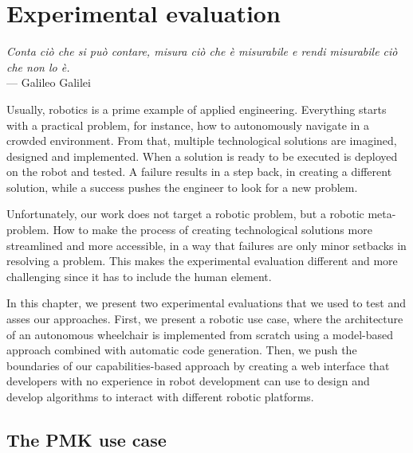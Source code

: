 \chapter[Experimental evaluation]{Experimental evaluation}\label{ch:Experiment}

\begin{flushright}{\slshape Conta ciò che si può contare, misura ciò che è misurabile e rendi misurabile ciò che non lo è.} \\ \medskip
    ---  Galileo Galilei
\end{flushright}

Usually, robotics is a prime example of applied engineering. Everything starts with a practical problem, for instance, how to autonomously navigate in a crowded environment. From that, multiple technological solutions are imagined, designed and implemented. When a solution is ready to be executed is deployed on the robot and tested. A failure results in a step back, in creating a different solution, while a success pushes the engineer to look for a new problem. 

Unfortunately, our work does not target a robotic problem, but a robotic meta-problem. How to make the process of creating technological solutions more streamlined and more accessible, in a way that failures are only minor setbacks in resolving a problem. This makes the experimental evaluation different and more challenging since it has to include the human element.

In this chapter, we present two experimental evaluations that we used to test and asses our approaches. First, we present a robotic use case, where the architecture of an autonomous wheelchair is implemented from scratch using a model-based approach combined with automatic code generation. Then, we push the boundaries of our capabilities-based approach by creating a web interface that developers with no experience in robot development can use to design and develop algorithms to interact with different robotic platforms.

\newpage

\minitoc
\newpage

\section{The PMK use case}
\label{sec:pmk}

